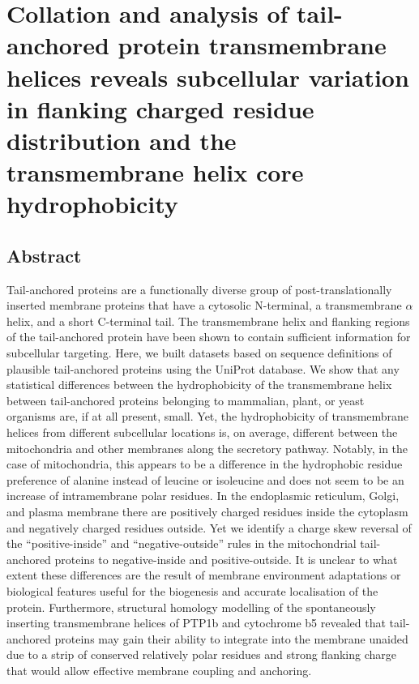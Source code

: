 \chapter{Collation and analysis of tail-anchored protein transmembrane helices reveals subcellular variation in flanking charged residue distribution and the transmembrane helix core hydrophobicity}

\sloppy

\section{Abstract}

Tail\--anchored proteins are a functionally diverse group of post\--translationally inserted membrane proteins that have a cytosolic N\--terminal, a transmembrane $\alpha$ helix, and a short C\--terminal tail.
The transmembrane helix and flanking regions of the tail\--anchored protein have been shown to contain sufficient information for subcellular targeting.
Here, we built datasets based on sequence definitions of plausible tail\--anchored proteins using the  UniProt database.
We show that any statistical differences between the hydrophobicity of the transmembrane helix between tail\--anchored proteins belonging to mammalian, plant, or yeast organisms are, if at all present, small.
Yet, the hydrophobicity of transmembrane helices from different subcellular locations is, on average, different between the mitochondria and other membranes along the secretory pathway.
Notably, in the case of mitochondria, this appears to be a difference in the hydrophobic residue preference of alanine instead of leucine or isoleucine and does not seem to be an increase of intramembrane polar residues.
In the endoplasmic reticulum, Golgi, and plasma membrane there are positively charged residues inside the cytoplasm and negatively charged residues outside.
Yet we identify a charge skew reversal of the ``positive\--inside'' and ``negative\--outside'' rules in the mitochondrial tail\--anchored proteins to negative\--inside and positive\--outside.
It is unclear to what extent these differences are the result of membrane environment adaptations or biological features useful for the biogenesis and accurate localisation of the protein.
Furthermore, structural homology modelling of the spontaneously inserting transmembrane helices of PTP1b and cytochrome b5 revealed that tail\--anchored proteins may gain their ability to integrate into the membrane unaided due to a strip of conserved relatively polar residues and strong flanking charge that would allow effective membrane coupling and anchoring.

